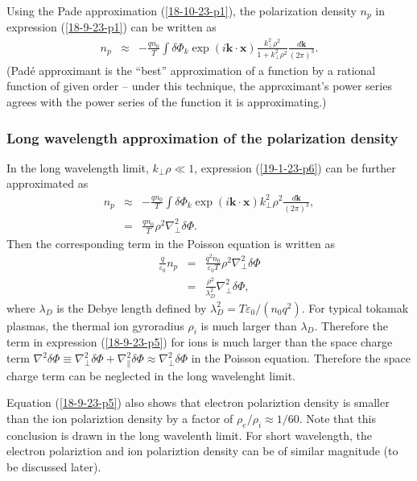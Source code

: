 \documentclass{llncs}
\begin{document}
Using the Pade approximation (\ref{18-10-23-p1}), the polarization density
$n_p$ in expression (\ref{18-9-23-p1}) can be written as
\begin{eqnarray}
  n_p & \approx & - \frac{q n_0}{T} \int \delta \Phi_k \exp (i\mathbf{k} \cdot
  \mathbf{x}) \frac{k_{\perp}^2 \rho^2}{1 + k_{\perp}^2 \rho^2}
  \frac{d\mathbf{k}}{(2 \pi)^3} .  \label{19-1-23-p6}
\end{eqnarray}
(Pad{\'e} approximant is the ``best'' approximation of a function by a
rational function of given order -- under this technique, the approximant's
power series agrees with the power series of the function it is
approximating.)

\subsubsection{Long wavelength approximation of the polarization density}

In the long wavelength limit, $k_{\perp} \rho \ll 1$, expression
(\ref{19-1-23-p6}) can be further approximated as
\begin{eqnarray}
  n_p & \approx & - \frac{q n_0}{T} \int \delta \Phi_k \exp (i\mathbf{k} \cdot
  \mathbf{x}) k_{\perp}^2 \rho^2 \frac{d\mathbf{k}}{(2 \pi)^3}, \nonumber\\
  & = & \frac{q n_0}{T} \rho^2 \nabla_{\perp}^2 \delta \Phi . 
  \label{19-1-23-p5}
\end{eqnarray}
Then the corresponding term in the Poisson equation is written as
\begin{eqnarray}
  \frac{q}{\varepsilon_0} n_p & = & \frac{q^2 n_0}{\varepsilon_0 T} \rho^2
  \nabla_{\perp}^2 \delta \Phi \nonumber\\
  & = & \frac{\rho^2}{\lambda_D^2} \nabla_{\perp}^2 \delta \Phi, 
  \label{18-9-23-p5}
\end{eqnarray}
where $\lambda_D$ is the Debye length defined by $\lambda_D^2 = T
\varepsilon_0 / (n_0 q^2)$. For typical tokamak plasmas, the thermal ion
gyroradius $\rho_i$ is much larger than $\lambda_D$. Therefore the term in
expression (\ref{18-9-23-p5}) for ions is much larger than the space charge
term $\nabla^2 \delta \Phi \equiv \nabla^2_{\perp} \delta \Phi +
\nabla^2_{\parallel} \delta \Phi \approx \nabla^2_{\perp} \delta \Phi$ in the
Poisson equation. Therefore the space charge term can be neglected in the long
wavelenght limit.

Equation (\ref{18-9-23-p5}) also shows that electron polariztion density is
smaller than the ion polariztion density by a factor of $\rho_e / \rho_i
\approx 1 / 60$. Note that this conclusion is drawn in the long wavelenth
limit. For short wavelength, the electron polariztion and ion polariztion
density can be of similar magnitude (to be discussed later).
\end{document}
